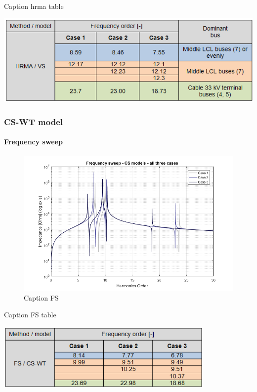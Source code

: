 \documentclass[12pt]{report} %
\begin{document}
\begin{table}[htb]
	\centering
	\caption{Caption hrma table}
	\includegraphics[width=1\textwidth]{img/Case123/HRMA_VS_table.png}
  	\label{table:comparison_hrmavs}
\end{table}
\FloatBarrier

\subsubsection{CS-WT model}
\paragraph{Frequency sweep}

\begin{figure}[htb]
	\centering
	\includegraphics[width=1\textwidth]{img/Case123/FS_CS_log.png}
	\caption{Caption FS}
  	\label{fig:comparison_fscs}
\end{figure}
\FloatBarrier

\begin{table}[htb]
	\centering
	\caption{Caption FS table}
	\includegraphics[width=0.8\textwidth]{img/Case123/FS_CS_table.png}
  	\label{table:comparison_fscs}
\end{table}
\FloatBarrier
\end{document}
